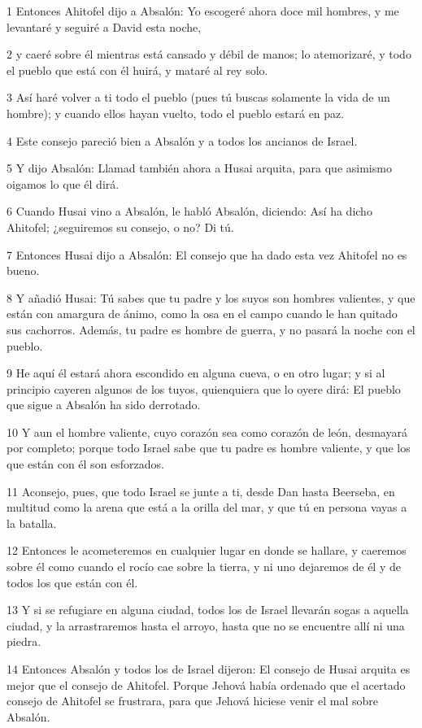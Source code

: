 \par 1 Entonces Ahitofel dijo a Absalón: Yo escogeré ahora doce mil hombres, y me levantaré y seguiré a David esta noche,
\par 2 y caeré sobre él mientras está cansado y débil de manos; lo atemorizaré, y todo el pueblo que está con él huirá, y mataré al rey solo.
\par 3 Así haré volver a ti todo el pueblo (pues tú buscas solamente la vida de un hombre); y cuando ellos hayan vuelto, todo el pueblo estará en paz.
\par 4 Este consejo pareció bien a Absalón y a todos los ancianos de Israel.
\par 5 Y dijo Absalón: Llamad también ahora a Husai arquita, para que asimismo oigamos lo que él dirá.
\par 6 Cuando Husai vino a Absalón, le habló Absalón, diciendo: Así ha dicho Ahitofel; ¿seguiremos su consejo, o no? Di tú.
\par 7 Entonces Husai dijo a Absalón: El consejo que ha dado esta vez Ahitofel no es bueno.
\par 8 Y añadió Husai: Tú sabes que tu padre y los suyos son hombres valientes, y que están con amargura de ánimo, como la osa en el campo cuando le han quitado sus cachorros. Además, tu padre es hombre de guerra, y no pasará la noche con el pueblo.
\par 9 He aquí él estará ahora escondido en alguna cueva, o en otro lugar; y si al principio cayeren algunos de los tuyos, quienquiera que lo oyere dirá: El pueblo que sigue a Absalón ha sido derrotado.
\par 10 Y aun el hombre valiente, cuyo corazón sea como corazón de león, desmayará por completo; porque todo Israel sabe que tu padre es hombre valiente, y que los que están con él son esforzados.
\par 11 Aconsejo, pues, que todo Israel se junte a ti, desde Dan hasta Beerseba, en multitud como la arena que está a la orilla del mar, y que tú en persona vayas a la batalla.
\par 12 Entonces le acometeremos en cualquier lugar en donde se hallare, y caeremos sobre él como cuando el rocío cae sobre la tierra, y ni uno dejaremos de él y de todos los que están con él.
\par 13 Y si se refugiare en alguna ciudad, todos los de Israel llevarán sogas a aquella ciudad, y la arrastraremos hasta el arroyo, hasta que no se encuentre allí ni una piedra.
\par 14 Entonces Absalón y todos los de Israel dijeron: El consejo de Husai arquita es mejor que el consejo de Ahitofel. Porque Jehová había ordenado que el acertado consejo de Ahitofel se frustrara, para que Jehová hiciese venir el mal sobre Absalón.
